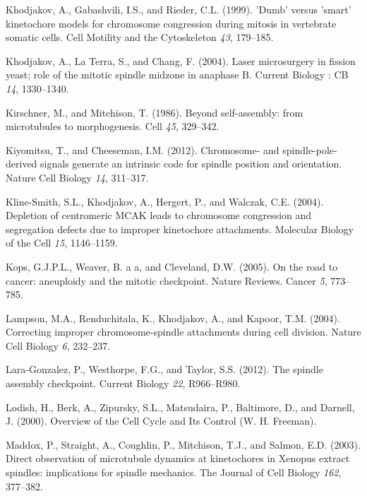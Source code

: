 \documentclass[12pt,a4paper,twoside,openright]{book}
\begin{document}
Khodjakov, A., Gabashvili, I.S., and Rieder, C.L. (1999). 'Dumb' versus
'smart' kinetochore models for chromosome congression during mitosis in
vertebrate somatic cells. Cell Motility and the Cytoskeleton \emph{43},
179--185.

Khodjakov, A., La Terra, S., and Chang, F. (2004). Laser microsurgery in
fission yeast; role of the mitotic spindle midzone in anaphase B.
Current Biology : CB \emph{14}, 1330--1340.

Kirschner, M., and Mitchison, T. (1986). Beyond self-assembly: from
microtubules to morphogenesis. Cell \emph{45}, 329--342.

Kiyomitsu, T., and Cheeseman, I.M. (2012). Chromosome- and
spindle-pole-derived signals generate an intrinsic code for spindle
position and orientation. Nature Cell Biology \emph{14}, 311--317.

Kline-Smith, S.L., Khodjakov, A., Hergert, P., and Walczak, C.E. (2004).
Depletion of centromeric MCAK leads to chromosome congression and
segregation defects due to improper kinetochore attachments. Molecular
Biology of the Cell \emph{15}, 1146--1159.

Kops, G.J.P.L., Weaver, B. a a, and Cleveland, D.W. (2005). On the road
to cancer: aneuploidy and the mitotic checkpoint. Nature Reviews. Cancer
\emph{5}, 773--785.

Lampson, M.A., Renduchitala, K., Khodjakov, A., and Kapoor, T.M. (2004).
Correcting improper chromosome-spindle attachments during cell division.
Nature Cell Biology \emph{6}, 232--237.

Lara-Gonzalez, P., Westhorpe, F.G., and Taylor, S.S. (2012). The spindle
assembly checkpoint. Current Biology \emph{22}, R966--R980.

Lodish, H., Berk, A., Zipursky, S.L., Matsudaira, P., Baltimore, D., and
Darnell, J. (2000). Overview of the Cell Cycle and Its Control (W. H.
Freeman).

Maddox, P., Straight, A., Coughlin, P., Mitchison, T.J., and Salmon,
E.D. (2003). Direct observation of microtubule dynamics at kinetochores
in Xenopus extract spindles: implications for spindle mechanics. The
Journal of Cell Biology \emph{162}, 377--382.
\end{document}
